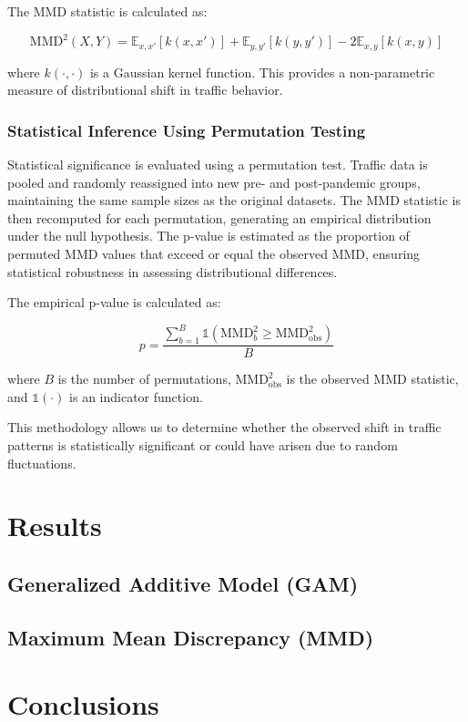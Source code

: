 \documentclass{article}
\begin{document}
The MMD statistic is calculated as:

\[
\text{MMD}^2(X, Y) = \mathbb{E}_{x,x'}[k(x, x')] + \mathbb{E}_{y,y'}[k(y, y')] - 2\mathbb{E}_{x,y}[k(x, y)]
\]

where \( k(\cdot, \cdot) \) is a Gaussian kernel function. This provides a non-parametric measure of distributional shift in traffic behavior.

\subsubsection{Statistical Inference Using Permutation Testing}

Statistical significance is evaluated using a permutation test. Traffic data is pooled and randomly reassigned into new pre- and post-pandemic groups, maintaining the same sample sizes as the original datasets. The MMD statistic is then recomputed for each permutation, generating an empirical distribution under the null hypothesis. The p-value is estimated as the proportion of permuted MMD values that exceed or equal the observed MMD, ensuring statistical robustness in assessing distributional differences.

The empirical p-value is calculated as:

\[
p = \frac{\sum_{b=1}^{B} \mathbb{1}(\text{MMD}^2_b \geq \text{MMD}^2_{\text{obs}})}{B}
\]

where \( B \) is the number of permutations, \( \text{MMD}^2_{\text{obs}} \) is the observed MMD statistic, and \( \mathbb{1}(\cdot) \) is an indicator function.

This methodology allows us to determine whether the observed shift in traffic patterns is statistically significant or could have arisen due to random fluctuations.

\section{Results}

\subsection{Generalized Additive Model (GAM)}

\subsection{Maximum Mean Discrepancy (MMD)}

\section{Conclusions}
\end{document}
